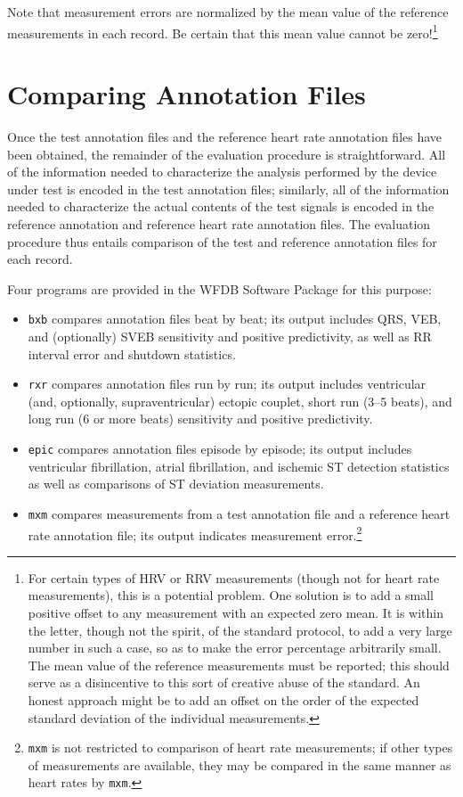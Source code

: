 Note that measurement errors are normalized by the mean value of the reference
measurements in each record.  Be certain that this mean value cannot be
zero!\footnote{
For certain types of HRV or RRV measurements (though not for heart rate
measurements), this is a potential problem.  One solution is to add a small
positive offset to any measurement with an expected zero mean.  It is within
the letter, though not the spirit, of the standard protocol, to add a
very large number in such a case, so as to make the error percentage
arbitrarily small.  The mean value of the reference measurements must be
reported; this should serve as a disincentive to this sort of creative abuse
of the standard.  An honest approach might be to add an offset on the order of
the expected standard deviation of the individual measurements.}

\section{Comparing Annotation Files}

Once the test annotation files and the reference heart rate annotation files
have been obtained, the remainder of the evaluation procedure is
straightforward.  All of the information needed to characterize the analysis
performed by the device under test is encoded in the test annotation files;
similarly, all of the information needed to characterize the actual contents
of the test signals is encoded in the reference annotation and reference
heart rate annotation files.  The evaluation procedure thus entails comparison
of the test and reference annotation files for each record.

Four programs are provided in the WFDB Software Package for this purpose:
\begin{itemize}
   \item {\tt bxb} compares annotation files beat by beat; its output
includes QRS, VEB, and (optionally) SVEB sensitivity and positive
predictivity, as well as RR interval error and shutdown statistics.

   \item {\tt rxr} compares annotation files run by run; its output
includes ventricular (and, optionally, supraventricular) ectopic couplet, short
run (3--5 beats), and long run (6 or more beats) sensitivity and positive
predictivity.

   \item {\tt epic} compares annotation files episode by episode; its
output includes ventricular fibrillation, atrial fibrillation, and ischemic ST
detection statistics as well as comparisons of ST deviation measurements.

   \item {\tt mxm} compares measurements from a test annotation
file and a reference heart rate annotation file;  its output indicates
measurement error.\footnote{
{\tt mxm} is not restricted to comparison of heart rate measurements;  if
other types of measurements are available, they may be compared in the same
manner as heart rates by {\tt mxm}.}
\end{itemize}

